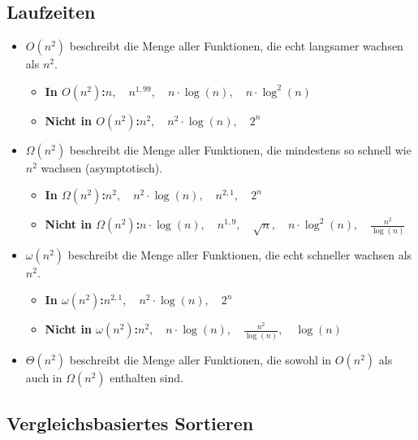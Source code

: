 \documentclass{scrartcl}%
\begin{document}

    \subsection*{Laufzeiten}
    \label{subsec:laufzeiten}

    \begin{itemize}
        \item $O(n^2)$ beschreibt die Menge aller Funktionen, die echt langsamer wachsen als $n^2$.
        \begin{itemize}
            \item \textbf{In $O(n^2)$:}\quad $n,\quad n^{1,99},\quad n \cdot \log(n),\quad n \cdot \log^2(n)$
            \item \textbf{Nicht in $O(n^2)$:}\quad $n^2,\quad n^2 \cdot \log(n),\quad 2^n$
        \end{itemize}
        \item $\Omega(n^2)$ beschreibt die Menge aller Funktionen, die mindestens so schnell wie $n^2$ wachsen (asymptotisch).
        \begin{itemize}
            \item \textbf{In $\Omega(n^2)$:}\quad $n^2,\quad n^2 \cdot \log(n),\quad n^{2,1},\quad 2^n$
            \item \textbf{Nicht in $\Omega(n^2)$:}\quad $n \cdot \log(n),\quad n^{1,9},\quad \sqrt{n},\quad n \cdot \log^2(n),\quad \frac{n^2}{\log(n)}$
        \end{itemize}
        \item $\omega(n^2)$ beschreibt die Menge aller Funktionen, die echt schneller wachsen als $n^2$.
        \begin{itemize}
            \item \textbf{In $\omega(n^2)$:}\quad $n^{2,1},\quad n^2 \cdot \log(n), \quad 2^n$
            \item \textbf{Nicht in $\omega(n^2)$:}\quad $n^2, \quad n \cdot \log(n), \quad \frac{n^2}{\log(n)}, \quad \log(n)$
        \end{itemize}
        \item $\Theta(n^2)$ beschreibt die Menge aller Funktionen, die sowohl in $O(n^2)$ als auch in $\Omega(n^2)$ enthalten sind.
    \end{itemize}

    \subsection*{Vergleichsbasiertes Sortieren}
    \label{subsec:vergleichsbasiertessortieren}
\end{document}
